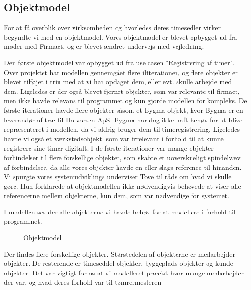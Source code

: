 \subsection{Objektmodel}

For at få overblik over virksomheden og hvorledes deres timesedler virker begyndte vi med en objektmodel. Vores objektmodel er blevet opbygget ud fra møder med Firmaet, og er blevet ændret undervejs med vejledning.

Den første objektmodel var opbygget ud fra use casen "Registrering af timer". Over projektet har modellen gennemgået flere iltterationer, og flere objekter er blevet tilføjet i trin med at vi har opdaget dem, eller evt. skulle arbejde med dem. Ligeledes er der også blevet fjernet objekter, som var relevante til firmaet, men ikke havde relevans til programmet og kun gjorde modellen for kompleks. De første iterationer havde flere objekter såsom et Bygma objekt, hvor Bygma er en leverandør af træ til Halvorsen ApS. Bygma har dog ikke haft behøv for at blive repræsenteret i modellen, da vi aldrig bruger dem til timeregistrering. Ligeledes havde vi også et værkstedsobjekt, som var irrelevant i forhold til at kunne registrere sine timer digitalt. I de første iterationer var mange objekter forbindelser til flere forskellige objekter, som skabte et uoverskueligt spindelvæv af forbindelser, da alle vores objekter havde en eller slags reference til hinanden. Vi spurgte vores systemudviklings underviser Tove til råds om hvad vi skulle gøre. Hun forklarede at objektmodellen ikke nødvendigvis behøvede at viser alle referencerne mellem objekterne, kun dem, som var nødvendige for systemet.

I modellen ses der alle objekterne vi havde behøv for at modellere i forhold til programmet.

\begin{figure}[H]
    \caption{Objektmodel}
    \label{fig:objektmodel}
\end{figure}

Der findes flere forskellige objekter. Størstedelen af objekterne er medarbejder objekter. De resterende er timeseddel objekter, byggeplads objekter og kunde objekter. Det var vigtigt for os at vi modelleret præcist hvor mange medarbejder der var, og hvad deres forhold var til tømrermesteren.